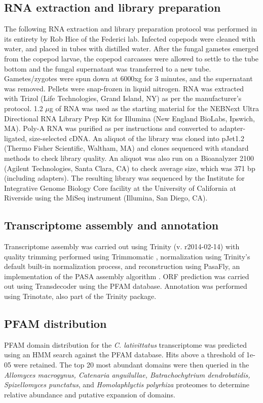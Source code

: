 \subsection*{RNA extraction and library preparation}
The following RNA extraction and library preparation protocol was performed in its entirety by Rob Hice of the Federici lab. Infected copepods were cleaned with water, and placed in tubes with distilled water. After the fungal gametes emerged from the copepod larvae, the copepod carcasses were allowed to settle to the tube bottom and the fungal supernatant was transferred to a new tube. Gametes/zygotes were spun down at 6000xg for 3 minutes, and the supernatant was removed. Pellets were snap-frozen in liquid nitrogen. RNA was extracted with Trizol  (Life Technologies, Grand Island, NY) as per the manufacturer's protocol. 1.2 $\mu$g of RNA was used as the starting material for the NEBNext Ultra Directional RNA Library Prep Kit for Illumina (New England BioLabs, Ipswich, MA). Poly-A RNA was purified as per instructions and converted to adapter-ligated, size-selected cDNA. An aliquot of the library was cloned into pJet1.2 (Thermo Fisher Scientific, Waltham, MA) and clones sequenced with standard methods to check library quality. An aliquot was also run on a Bioanalyzer 2100 (Agilent Technologies, Santa Clara, CA) to check average size, which was 371 bp (including adapters). The resulting library was sequenced by the Institute for Integrative Genome Biology Core facility at the University of California at Riverside using the MiSeq instrument (Illumina, San Diego, CA).\\
\subsection*{Transcriptome assembly and annotation}
Transcriptome assembly was carried out using Trinity (v. r2014-02-14) \cite{Grabherr2011} with quality trimming performed using Trimmomatic \cite{Bolger2014}, normalization using Trinity's default built-in normalization process, and reconstruction using PasaFly, an implementation of the PASA assembly algorithm \cite{Haas2013}. ORF prediction was carried out using Transdecoder \cite{Haas2013} using the PFAM database. Annotation was performed using Trinotate, also part of the Trinity package.\\
\subsection*{PFAM distribution}
PFAM domain distribution for the \textit{C. lativittatus} transcriptome was predicted using an HMM search against the PFAM database. Hits above a threshold of 1e-05 were retained. The top 20 most abundant domains were then queried in the \textit{Allomyces macrogynus, Catenaria anguilullae, Batrachochytrium dendrobatidis, Spizellomyces punctatus}, and \textit{Homolaphlyctis polyrhiza} proteomes to determine relative abundance and putative expansion of domains. \\

